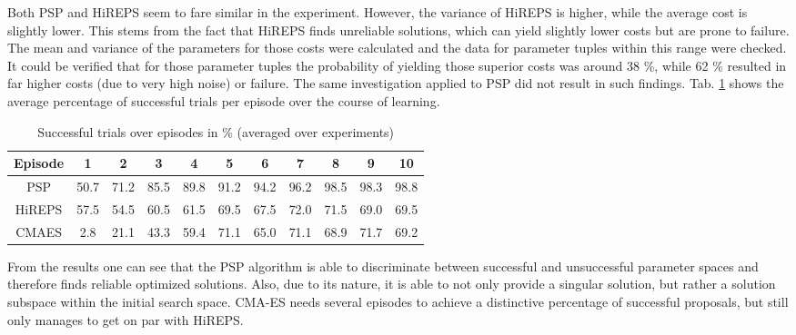 Both PSP and HiREPS seem to fare similar in the experiment.
However, the variance of HiREPS is higher, while the average cost is slightly lower.
This stems from the fact that HiREPS finds unreliable solutions, which can yield slightly lower costs but are prone to failure.
The mean and variance of the parameters for those costs were calculated and the data for parameter tuples within this range were checked.
It could be verified that for those parameter tuples the probability of yielding those superior costs was around 38 \%, while 62 \% resulted in far higher costs (due to very high noise) or failure.
The same investigation applied to PSP did not result in such findings.
Tab. \ref{tab:learning:exp_1_3:results2} shows the average percentage of successful trials per episode over the course of learning.


\begin{table}[ht!]
	\begin{center}
		\begin{tabular}{ | c | c | c | c | c | c | c | c | c | c |c|}
			\hline
			Episode & 1 & 2 & 3& 4 & 5 & 6 & 7 & 8& 9 & 10  \textbf{} \\ \hline
			PSP & 50.7 & 71.2 & 85.5 & 89.8 & 91.2 & 94.2  &96.2& 98.5& 98.3& 98.8\\ \hline
			HiREPS & 57.5 & 54.5 & 60.5 & 61.5 & 69.5 & 67.5 & 72.0 &71.5&69.0&69.5\\ \hline
			CMAES & 2.8 & 21.1 & 43.3 & 59.4 & 71.1 & 65.0 & 71.1 & 68.9 & 71.7 & 69.2\\ \hline
		\end{tabular}
	
		\vspace{3pt}
		\caption{Successful trials over episodes in \% (averaged over experiments)}
		\label{tab:learning:exp_1_3:results2}
	\end{center}
\end{table}

From the results one can see that the PSP algorithm is able to discriminate between successful and unsuccessful parameter spaces and therefore finds reliable optimized solutions.
Also, due to its nature, it is able to not only provide a singular solution, but rather a solution subspace within the initial search space.
CMA-ES needs several episodes to achieve a distinctive percentage of successful proposals, but still only manages to get on par with HiREPS.

